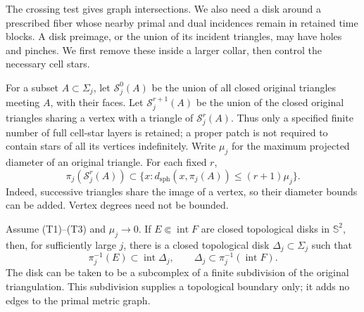 The crossing test gives graph intersections. We also need a disk
around a prescribed fiber whose nearby primal and dual incidences
remain in retained time blocks. A disk preimage, or the union of its
incident triangles, may have holes and pinches. We first remove
these inside a larger collar, then control the necessary cell stars.

For a subset $A\subset\Sigma_j$, let $\mathcal S_j^0(A)$ be the union
of all closed original triangles meeting $A$, with their faces. Let
$\mathcal S_j^{r+1}(A)$ be the union of the closed original triangles
sharing a vertex with a triangle of $\mathcal S_j^r(A)$. Thus only a
specified finite number of full cell-star layers is retained; a proper patch is not required to contain stars of all its
vertices indefinitely. Write $\mu_j$ for the maximum projected
diameter of an original triangle. For each fixed $r$,
\begin{equation}\label{bg:star-image-bound}
 \pi_j(\mathcal S_j^r(A))
 \subset \{x:d_{\mathrm{sph}}(x,\pi_j(A))\le(r+1)\mu_j\}.
\end{equation}
Indeed, successive triangles share the image of a vertex, so their
diameter bounds can be added. Vertex degrees need not be bounded.

\begin{lemma}
\label{bg:cellular-disk}
Assume (T1)--(T3) and $\mu_j\to0$. If $E\Subset\operatorname{int}F$
are closed topological disks in $\mathbb S^2$, then, for sufficiently
large $j$, there is a closed topological disk $\Delta_j\subset\Sigma_j$
such that
\[
 \pi_j^{-1}(E)\subset\operatorname{int}\Delta_j,
 \qquad
 \Delta_j\subset\pi_j^{-1}(\operatorname{int}F).
\]
The disk can be taken to be a subcomplex of a finite subdivision
of the original triangulation. This subdivision supplies a topological
boundary only; it adds no edges to the primal metric graph.
\end{lemma}

